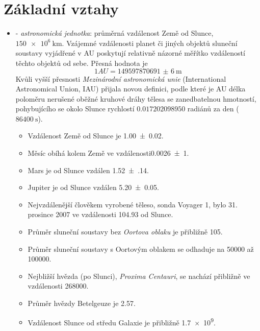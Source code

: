   \section{Základní vztahy}
    \begin{itemize}
      \item \wikiAU - \emph{astronomická jednotka}: průměrná vzdálenost Země od Slunce, 
      $\qty{150e6}{\km}$. Vzájemné vzdálenosti planet či jiných objektů sluneční soustavy 
      vy\-já\-dře\-né v AU poskytují relativně názorné měřítko vzdáleností těchto objektů od sebe. 
      Přesná hodnota je
      \begin{equation*}
        1 AU = \SI[multi-part-units = single]{149597870691(6)}{\m}
      \end{equation*}
      Kvůli vyšší přesnosti \emph{Mezinárodní astronomická unie} (International Astronomical 
      Union, IAU) přijala novou de\-fi\-ni\-ci, podle které je AU délka poloměru nerušené oběžné 
      kruhové dráhy tělesa se zanedbatelnou hmotností, pohybujícího se okolo Slunce rychlostí 
      \newline \(\num{0,017202098950}\) radiánů za den (\(\qty{86400}{\second}\)). 
        \begin{itemize}
          \item Vzdálenost Země od Slunce je \qty{1.00(2)}{\AU}.
          \item Měsíc obíhá kolem Země ve vzdálenosti\newline \qty{0,0026(1)}{\AU}.
          \item Mars je od Slunce vzdálen \qty{1.52(14)}{\AU}.
          \item Jupiter je od Slunce vzdálen \qty{5.20(5)}{\AU}.
          \item Nejvzdálenější člověkem vyrobené těleso, sonda \newline Voyager 1, bylo 31.
                prosince 2007 ve vzdálenosti \qty{104.93}{\AU} od Slunce.
          \item Průměr sluneční soustavy bez \emph{Oortova oblaku} je přibližně \qty{105}{\AU}.
          \item Průměr sluneční soustavy s Oortovým oblakem se odhaduje na \qty{50000}{\AU} až    
                \qty{100000}{\AU}.
          \item Nejbližší hvězda (po Slunci), \emph{Proxima Centauri}, se nachází přibližně ve 
                vzdálenosti \qty{268000}{\AU}.
          \item Průměr hvězdy Betelgeuze je \qty{2.57}{\AU}.
          \item Vzdálenost Slunce od středu Galaxie je přibližně \qty{1.7e9}{\AU}.

\end{itemize}
\end{itemize}
